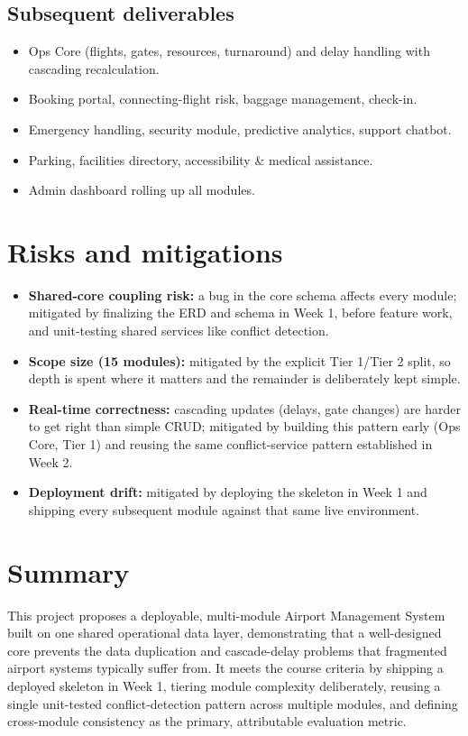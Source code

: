 \documentclass[11pt,a4paper]{article}
\begin{document}
\subsection{Subsequent deliverables}
\begin{itemize}[leftmargin=0.7cm]
    \item Ops Core (flights, gates, resources, turnaround) and delay
      handling with cascading recalculation.
    \item Booking portal, connecting-flight risk, baggage management,
      check-in.
    \item Emergency handling, security module, predictive analytics,
      support chatbot.
    \item Parking, facilities directory, accessibility \& medical
      assistance.
    \item Admin dashboard rolling up all modules.
\end{itemize}

\section{Risks and mitigations}
\begin{itemize}[leftmargin=0.7cm]
    \item \textbf{Shared-core coupling risk:} a bug in the core schema
      affects every module; mitigated by finalizing the ERD and schema
      in Week 1, before feature work, and unit-testing shared services
      like conflict detection.
    \item \textbf{Scope size (15 modules):} mitigated by the explicit
      Tier 1/Tier 2 split, so depth is spent where it matters and the
      remainder is deliberately kept simple.
    \item \textbf{Real-time correctness:} cascading updates (delays,
      gate changes) are harder to get right than simple CRUD;
      mitigated by building this pattern early (Ops Core, Tier 1) and
      reusing the same conflict-service pattern established in Week 2.
    \item \textbf{Deployment drift:} mitigated by deploying the
      skeleton in Week 1 and shipping every subsequent module against
      that same live environment.
\end{itemize}

\section{Summary}
This project proposes a deployable, multi-module Airport Management
System built on one shared operational data layer, demonstrating that
a well-designed core prevents the data duplication and cascade-delay
problems that fragmented airport systems typically suffer from. It
meets the course criteria by shipping a deployed skeleton in Week 1,
tiering module complexity deliberately, reusing a single unit-tested
conflict-detection pattern across multiple modules, and defining
cross-module consistency as the primary, attributable evaluation
metric.
\end{document}
